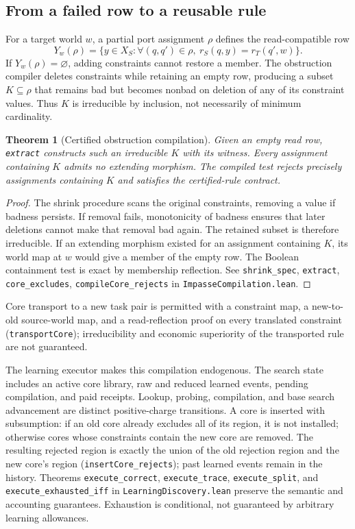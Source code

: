 \documentclass[10pt,letterpaper]{article}
\newtheorem{theorem}{Theorem}[section]
\newcommand{\rc}[1]{\texttt{#1}}
\begin{document}
\subsection{From a failed row to a reusable rule}
For a target world $w$, a partial port assignment $\rho$ defines the read-compatible row
\[
 Y_w(\rho)=\{y\in X_S: \forall(q,q')\in\rho,\ r_S(q,y)=r_T(q',w)\}.
\]
If $Y_w(\rho)=\varnothing$, adding constraints cannot restore a member. The obstruction compiler deletes constraints while retaining an empty row, producing a subset $K\subseteq\rho$ that remains bad but becomes nonbad on deletion of any of its constraint values. Thus $K$ is irreducible by inclusion, not necessarily of minimum cardinality.
\begin{theorem}[Certified obstruction compilation]\label{thm:core}
Given an empty read row, \rc{extract} constructs such an irreducible $K$ with its witness. Every assignment containing $K$ admits no extending morphism. The compiled test rejects precisely assignments containing $K$ and satisfies the certified-rule contract.
\end{theorem}
\begin{proof}
The shrink procedure scans the original constraints, removing a value if badness persists. If removal fails, monotonicity of badness ensures that later deletions cannot make that removal bad again. The retained subset is therefore irreducible. If an extending morphism existed for an assignment containing $K$, its world map at $w$ would give a member of the empty row. The Boolean containment test is exact by membership reflection. See \rc{shrink\_spec}, \rc{extract}, \rc{core\_excludes}, \rc{compileCore\_rejects} in \rc{ImpasseCompilation.lean}.
\end{proof}
Core transport to a new task pair is permitted with a constraint map, a new-to-old source-world map, and a read-reflection proof on every translated constraint (\rc{transportCore}); irreducibility and economic superiority of the transported rule are not guaranteed.

The learning executor makes this compilation endogenous. The search state includes an active core library, raw and reduced learned events, pending compilation, and paid receipts. Lookup, probing, compilation, and base search advancement are distinct positive-charge transitions. A core is inserted with subsumption: if an old core already excludes all of its region, it is not installed; otherwise cores whose constraints contain the new core are removed. The resulting rejected region is exactly the union of the old rejection region and the new core's region (\rc{insertCore\_rejects}); past learned events remain in the history. Theorems \rc{execute\_correct}, \rc{execute\_trace}, \rc{execute\_split}, and \rc{execute\_exhausted\_iff} in \rc{LearningDiscovery.lean} preserve the semantic and accounting guarantees. Exhaustion is conditional, not guaranteed by arbitrary learning allowances.
\end{document}
